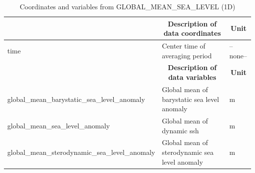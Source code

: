 \begin{longtable}{|m{}|m{}|m{}|}
\caption{Coordinates and variables from GLOBAL\_MEAN\_SEA\_LEVEL (1D)}
\label{tab:table-<xarray.Dataset> Size: 228kB
Dimensions:                                     (time: 9497)
Coordinates:
  * time                                        (time) datetime64[ns] 76kB 19...
Data variables:
    global_mean_barystatic_sea_level_anomaly    (time) float32 38kB ...
    global_mean_sea_level_anomaly               (time) float32 38kB ...
    global_mean_sterodynamic_sea_level_anomaly  (time) float64 76kB ...
Attributes: (12/48)
    acknowledgement:              This research was carried out by the Jet Pr...
    author:                       Ian Fenty and Ou Wang
    cdm_data_type:                Grid
    comment:                      1D time series calculated from fields on th...
    Conventions:                  CF-1.8, ACDD-1.3
    coordinates_comment:          Note: the global 'coordinates' attribute de...
    ...                           ...
    time_coverage_duration:       P1D
    time_coverage_end:            2017-12-31T12:00:00
    time_coverage_resolution:     P1D
    time_coverage_start:          1992-01-01T12:00:00
    title:                        ECCO Global Mean Sea Level - Daily Mean (Ve...
    uuid:                         93ffdb44-86d8-11eb-a688-f8f21e2ee3e0-fields} \\ 
\hline \endfirsthead \endhead \endfoot \hline \endlastfoot
\rowcolor{lightgray} \multicolumn{1}{|c|}{\textbf{Coordinates}} & \multicolumn{1}{|c|}{\textbf{Description of data coordinates}} &  \multicolumn{1}{|c|}{\textbf{Unit}}\\ \hline
time &Center time of averaging period &--none--  \\ \hline
\rowcolor{lightgray} \multicolumn{1}{|c|}{\textbf{Variables}} & \multicolumn{1}{|c|}{\textbf{Description of data variables}} &  \multicolumn{1}{|c|}{\textbf{Unit}}\\ \hline
global\_mean\_barystatic\_sea\_level\_anomaly &Global mean of barystatic sea level anomaly &m  \\ \hline
global\_mean\_sea\_level\_anomaly &Global mean of dynamic ssh &m  \\ \hline
global\_mean\_sterodynamic\_sea\_level\_anomaly &Global mean of sterodynamic sea level anomaly &m  \\ \hline
\end{longtable}

\newp
\pagebreak
